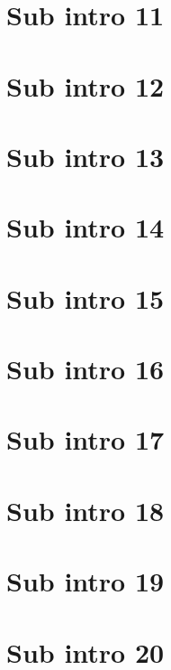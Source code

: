 \section{Sub intro 11}
\section{Sub intro 12}
\section{Sub intro 13}
\section{Sub intro 14}
\section{Sub intro 15}
\section{Sub intro 16}
\section{Sub intro 17}
\section{Sub intro 18}
\section{Sub intro 19}
\section{Sub intro 20}